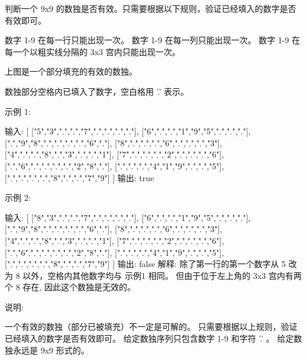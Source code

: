 判断一个 9x9 的数独是否有效。只需要根据以下规则，验证已经填入的数字是否有效即可。

    数字 1-9 在每一行只能出现一次。
    数字 1-9 在每一列只能出现一次。
    数字 1-9 在每一个以粗实线分隔的 3x3 宫内只能出现一次。

上图是一个部分填充的有效的数独。

数独部分空格内已填入了数字，空白格用 '.' 表示。

示例 1:

输入:
[
  ["5","3",".",".","7",".",".",".","."],
  ["6",".",".","1","9","5",".",".","."],
  [".","9","8",".",".",".",".","6","."],
  ["8",".",".",".","6",".",".",".","3"],
  ["4",".",".","8",".","3",".",".","1"],
  ["7",".",".",".","2",".",".",".","6"],
  [".","6",".",".",".",".","2","8","."],
  [".",".",".","4","1","9",".",".","5"],
  [".",".",".",".","8",".",".","7","9"]
]
输出: true

示例 2:

输入:
[
  ["8","3",".",".","7",".",".",".","."],
  ["6",".",".","1","9","5",".",".","."],
  [".","9","8",".",".",".",".","6","."],
  ["8",".",".",".","6",".",".",".","3"],
  ["4",".",".","8",".","3",".",".","1"],
  ["7",".",".",".","2",".",".",".","6"],
  [".","6",".",".",".",".","2","8","."],
  [".",".",".","4","1","9",".",".","5"],
  [".",".",".",".","8",".",".","7","9"]
]
输出: false
解释: 除了第一行的第一个数字从 5 改为 8 以外，空格内其他数字均与 示例1 相同。
     但由于位于左上角的 3x3 宫内有两个 8 存在, 因此这个数独是无效的。

说明:

    一个有效的数独（部分已被填充）不一定是可解的。
    只需要根据以上规则，验证已经填入的数字是否有效即可。
    给定数独序列只包含数字 1-9 和字符 '.' 。
    给定数独永远是 9x9 形式的。





























